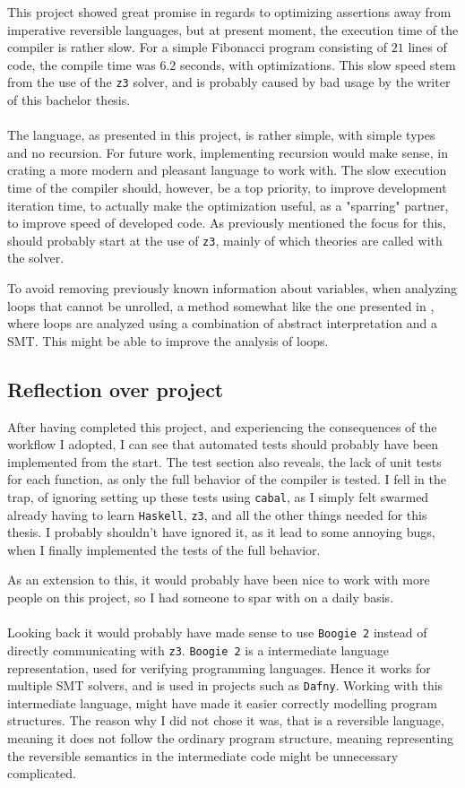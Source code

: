 This project showed great promise in regards to optimizing assertions away from imperative
reversible languages, but at present moment, the execution time of the compiler is rather slow.
For a simple Fibonacci program consisting of $21$ lines of code, the compile time was
$6.2$ seconds, with optimizations. This slow speed stem from the use of the \texttt{z3}
solver, and is probably caused by bad usage by the writer of this bachelor thesis.
\\
\\
The \lan language, as presented in this project, is rather simple, with simple types and
no recursion. For future work, implementing recursion would make sense, in crating a more
modern and pleasant language to work with. The slow execution time of the compiler should,
however, be a top priority, to improve development iteration time, to actually make the
optimization useful, as a "sparring" partner, to improve speed of developed code. As previously
mentioned the focus for this, should probably start at the use of \texttt{z3}, mainly of which
theories are called with the solver.

To avoid removing previously known information about variables, when analyzing loops that cannot
be unrolled, a method somewhat like the one presented in \cite{ai}, where loops are analyzed
using a combination of abstract interpretation and a SMT. This might be able to improve the
analysis of loops.


\subsection{Reflection over project }
After having completed this project, and experiencing the consequences of the workflow I
adopted, I can see that automated tests should probably have been implemented from the start.
The test section also reveals, the lack of unit tests for each function, as only the full
behavior of the compiler is tested. I fell in the trap, of ignoring setting up these tests
using \texttt{cabal}, as I simply felt swarmed already having to learn \texttt{Haskell}, \texttt{z3},
and all the other things needed for this thesis. I probably shouldn't have ignored it, as it lead
to some annoying bugs, when I finally implemented the tests of the full behavior.

As an extension to this, it would probably have been nice to work with more people on this
project, so I had someone to spar with on a daily basis.
\\
\\
Looking back it would probably have made sense to use \texttt{Boogie 2} instead of directly
communicating with \texttt{z3}. \texttt{Boogie 2} is a intermediate language representation, used
for verifying programming languages. Hence it works for multiple SMT solvers, and is used in
projects such as \texttt{Dafny}. Working with this intermediate language, might have made
it easier correctly modelling program structures. The reason why I did not chose it was, that
\lan is a reversible language, meaning it does not follow the ordinary program structure, meaning
representing the reversible semantics in the intermediate code might be unnecessary complicated.